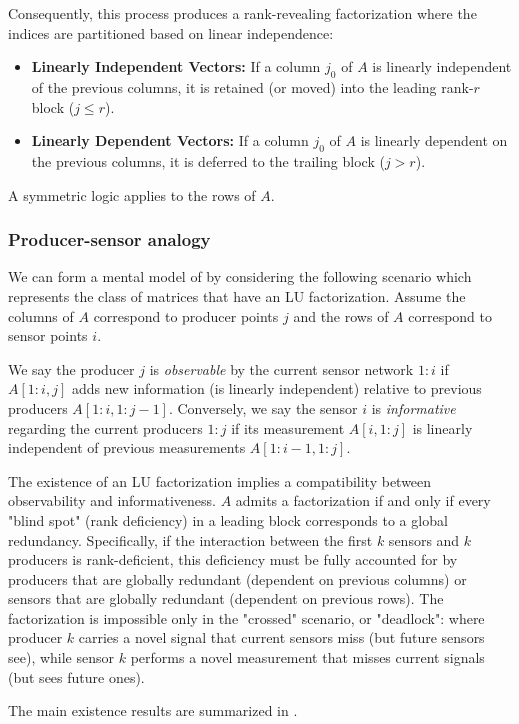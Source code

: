 \documentclass{article}
\begin{document}
Consequently, this process produces a rank-revealing factorization where the indices are partitioned based on linear independence:
\begin{itemize}
    \item \textbf{Linearly Independent Vectors:} If a column $j_0$ of $A$ is linearly independent of the previous columns, it is retained (or moved) into the leading rank-$r$ block ($j \le r$).
    \item \textbf{Linearly Dependent Vectors:} If a column $j_0$ of $A$ is linearly dependent on the previous columns, it is deferred to the trailing block ($j > r$).
\end{itemize}
A symmetric logic applies to the rows of $A$.

\subsubsection*{Producer-sensor analogy}

We can form a mental model of  by considering the following scenario which represents the class of matrices that have an LU factorization. Assume the columns of $A$ correspond to producer points $j$ and the rows of $A$ correspond to sensor points $i$.

We say the producer $j$ is \emph{observable} by the current sensor network $1:i$ if $A[1:i,j]$ adds new information (is linearly independent) relative to previous producers $A[1:i,1:j-1]$. Conversely, we say the sensor $i$ is \emph{informative} regarding the current producers $1:j$ if its measurement $A[i,1:j]$ is linearly independent of previous measurements $A[1:i-1,1:j]$.

The existence of an LU factorization implies a compatibility between observability and informativeness. $A$ admits a factorization if and only if every "blind spot" (rank deficiency) in a leading block corresponds to a global redundancy. Specifically, if the interaction between the first $k$ sensors and $k$ producers is rank-deficient, this deficiency must be fully accounted for by producers that are globally redundant (dependent on previous columns) or sensors that are globally redundant (dependent on previous rows). The factorization is impossible only in the "crossed" scenario, or "deadlock": where producer $k$ carries a novel signal that current sensors miss (but future sensors see), while sensor $k$ performs a novel measurement that misses current signals (but sees future ones).

The main existence results are summarized in .
\end{document}
